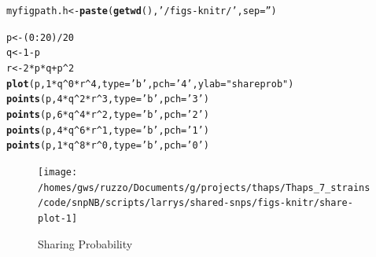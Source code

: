 \documentclass{article}\usepackage[]{graphicx}\usepackage[]{color}
\makeatletter
\newcommand{\hlnum}[1]{\textcolor[rgb]{0.686,0.059,0.569}{#1}}%
\newcommand{\hlstr}[1]{\textcolor[rgb]{0.192,0.494,0.8}{#1}}%
\newcommand{\hlopt}[1]{\textcolor[rgb]{0,0,0}{#1}}%
\newcommand{\hlstd}[1]{\textcolor[rgb]{0.345,0.345,0.345}{#1}}%
\newcommand{\hlkwb}[1]{\textcolor[rgb]{0.69,0.353,0.396}{#1}}%
\newcommand{\hlkwc}[1]{\textcolor[rgb]{0.333,0.667,0.333}{#1}}%
\newcommand{\hlkwd}[1]{\textcolor[rgb]{0.737,0.353,0.396}{\textbf{#1}}}%
\newenvironment{kframe}{%
 \def\at@end@of@kframe{}%
 \ifinner\ifhmode%
  \def\at@end@of@kframe{\end{minipage}}%
  \begin{minipage}{\columnwidth}%
 \fi\fi%
 \def\FrameCommand##1{\hskip\@totalleftmargin \hskip-\fboxsep
 \colorbox{shadecolor}{##1}\hskip-\fboxsep
     \hskip-\linewidth \hskip-\@totalleftmargin \hskip\columnwidth}%
 \MakeFramed {\advance\hsize-\width
   \@totalleftmargin\z@ \linewidth\hsize
   \@setminipage}}%
 {\par\unskip\endMakeFramed%
 \at@end@of@kframe}
\newenvironment{knitrout}{}{} %
\makeatother
\begin{document}
\begin{knitrout}\footnotesize
{}\color{fgcolor}\begin{kframe}
\begin{alltt}
\hlstd{myfigpath.h} \hlkwb{<-} \hlkwd{paste}\hlstd{(}\hlkwd{getwd}\hlstd{(),} \hlstr{'/figs-knitr/'}\hlstd{,} \hlkwc{sep}\hlstd{=}\hlstr{''}\hlstd{)}
\end{alltt}
\end{kframe}
\end{knitrout}

\begin{knitrout}\footnotesize
{}\color{fgcolor}\begin{kframe}
\begin{alltt}
\hlstd{p} \hlkwb{<-} \hlstd{(}\hlnum{0}\hlopt{:}\hlnum{20}\hlstd{)}\hlopt{/}\hlnum{20}
\hlstd{q} \hlkwb{<-} \hlnum{1}\hlopt{-}\hlstd{p}
\hlstd{r} \hlkwb{<-} \hlnum{2}\hlopt{*}\hlstd{p}\hlopt{*}\hlstd{q}\hlopt{+}\hlstd{p}\hlopt{^}\hlnum{2}
\hlkwd{plot}\hlstd{(  p,} \hlnum{1}\hlopt{*}\hlstd{q}\hlopt{^}\hlnum{0}\hlopt{*}\hlstd{r}\hlopt{^}\hlnum{4}\hlstd{,} \hlkwc{type}\hlstd{=}\hlstr{'b'}\hlstd{,}\hlkwc{pch}\hlstd{=}\hlstr{'4'}\hlstd{,} \hlkwc{ylab}\hlstd{=}\hlstr{"share prob"}\hlstd{)}
\hlkwd{points}\hlstd{(p,} \hlnum{4}\hlopt{*}\hlstd{q}\hlopt{^}\hlnum{2}\hlopt{*}\hlstd{r}\hlopt{^}\hlnum{3}\hlstd{,} \hlkwc{type}\hlstd{=}\hlstr{'b'}\hlstd{,}\hlkwc{pch}\hlstd{=}\hlstr{'3'}\hlstd{)}
\hlkwd{points}\hlstd{(p,} \hlnum{6}\hlopt{*}\hlstd{q}\hlopt{^}\hlnum{4}\hlopt{*}\hlstd{r}\hlopt{^}\hlnum{2}\hlstd{,} \hlkwc{type}\hlstd{=}\hlstr{'b'}\hlstd{,}\hlkwc{pch}\hlstd{=}\hlstr{'2'}\hlstd{)}
\hlkwd{points}\hlstd{(p,} \hlnum{4}\hlopt{*}\hlstd{q}\hlopt{^}\hlnum{6}\hlopt{*}\hlstd{r}\hlopt{^}\hlnum{1}\hlstd{,} \hlkwc{type}\hlstd{=}\hlstr{'b'}\hlstd{,}\hlkwc{pch}\hlstd{=}\hlstr{'1'}\hlstd{)}
\hlkwd{points}\hlstd{(p,} \hlnum{1}\hlopt{*}\hlstd{q}\hlopt{^}\hlnum{8}\hlopt{*}\hlstd{r}\hlopt{^}\hlnum{0}\hlstd{,} \hlkwc{type}\hlstd{=}\hlstr{'b'}\hlstd{,}\hlkwc{pch}\hlstd{=}\hlstr{'0'}\hlstd{)}
\end{alltt}
\end{kframe}\begin{figure}

{\centering \texttt{[image: /homes/gws/ruzzo/Documents/g/projects/thaps/Thaps\_7\_strains/code/snpNB/scripts/larrys/shared-snps/figs-knitr/share-plot-1]} 

}

\caption[Sharing Probability]{Sharing Probability}\label{fig:share-plot}
\end{figure}


\end{knitrout}
\end{document}
